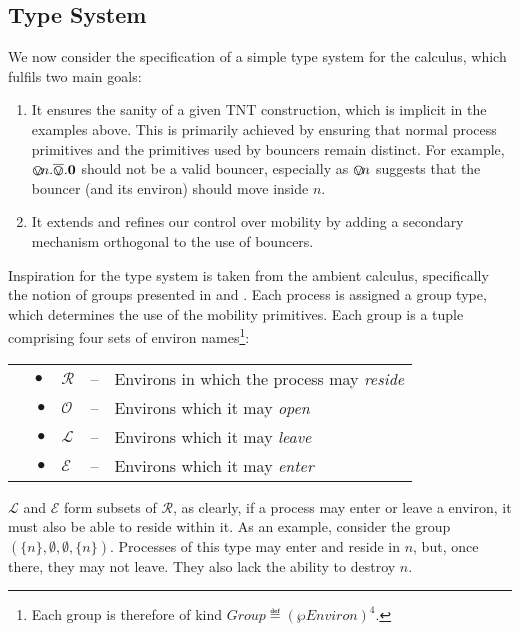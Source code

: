 \documentclass[orivec,envcountsame]{llncs}
\begin{document}
\subsection{Type System}
\label{typesys}

We now consider the specification of a simple type system for the
calculus, which fulfils two main goals:

\begin{enumerate}
\item It ensures the sanity of a given TNT construction, which is
  implicit in the examples above.  This is primarily achieved by
  ensuring that normal process primitives and the primitives used by
  bouncers remain distinct.  For example,
  $\varovee\!n.\overline{\varovee}.\textbf{0}$ should not be a valid bouncer,
  especially as $\varovee\!n$ suggests that the bouncer (and its environ)
  should move inside $n$.
\item It extends and refines our control over mobility by adding a
      secondary mechanism orthogonal to the use of bouncers.
\end{enumerate}

Inspiration for the type system is taken from the ambient calculus,
specifically the notion of groups presented in \cite{ambienttypes} and
\cite{m3}.  Each process is assigned a group type, which determines the
use of the mobility primitives.  Each group is a tuple comprising four
sets of environ names\footnote{Each group is therefore of kind $Group
\eqdef (\wp\mathit{Environ})^4$.}:

\begin{tabular}{rlcl}
$\quad \bullet$ & $\mathscr{R}$ & -- & Environs in which the process may
 \emph{reside} \\
$\bullet$ & $\mathscr{O}$ & -- & Environs which it may \emph{open} \\
$\bullet$ & $\mathscr{L}$ & -- & Environs which it may \emph{leave} \\
$\bullet$ & $\mathscr{E}$ & -- & Environs which it may \emph{enter}
\end{tabular}

$\mathscr{L}$ and $\mathscr{E}$ form subsets of $\mathscr{R}$, as
clearly, if a process may enter or leave a environ, it must also be able
to reside within it.  As an example, consider the group
$(\{n\},\emptyset, \emptyset,\{n\})$.  Processes of this type may enter
and reside in $n$, but, once there, they may not leave.  They also lack
the ability to destroy $n$.
\end{document}

